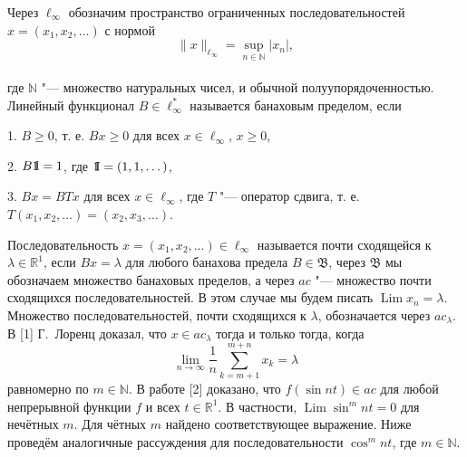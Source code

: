 
\vzmscaption



Через $\ell_\infty$ обозначим пространство ограниченных последовательностей 
$x = (x_1, x_2, \ldots)$ с нормой \\[-3mm]
$$
\|x\|_{\ell_\infty} = \sup_{n \in \mathbb N} |x_n|,
$$ \\[-3mm]
где $\mathbb N$ "--- множество натуральных чисел, и обычной полуупорядоченностью. 
Линейный функционал $B \in \ell^*_\infty$ называется банаховым пределом, если

	1. $B \geqslant 0$, т. е. $Bx \geqslant 0$ для всех $x \in \ell_\infty$,
	$x \geqslant 0$,

	2. $B\mathrm{1\negthickspace I} = 1$, где $\mathrm{1\negthickspace I} = (1, 1, \dots)$,

	3. $Bx = BTx$ для всех $x \in \ell_\infty$, где $T$ "--- оператор сдвига, т. е.
	$T(x_1, x_2, \dots) = (x_2, x_3, \dots)$.

Последовательность $x = (x_1, x_2, \ldots) \in \ell_\infty$ называется почти
сходящейся к $\lambda \in \mathbb R^1$, если $Bx = \lambda$ для любого банахова 
предела $B \in \mathfrak B$, через $\mathfrak B$ мы обозначаем множество банаховых
пределов, а через $ac$ "--- множество почти сходящихся последовательностей.
В этом случае мы будем писать $\operatorname{Lim} x_n = \lambda$. Множество
последовательностей, почти сходящихся к $\lambda$, обозначается через $ac_\lambda$.
В [1] Г.~Лоренц доказал, что $x \in ac_\lambda$ тогда и только тогда, когда \\[-3mm]
\begin{equation*}\label{Lorentz_theorem}
\lim_{n \to \infty} \frac 1n \sum_{k = m + 1}^{m + n} x_k = \lambda
\end{equation*} 
равномерно по $m \in \mathbb N$.
В работе [2] доказано, что $f(\sin nt) \in ac$ для любой непрерывной функции $f$
и всех $t \in \mathbb R^1$. В частности, $\operatorname{Lim} \sin^m nt = 0$ для
нечётных $m$. Для чётных $m$ найдено соответствующее выражение. Ниже проведём 
аналогичные рассуждения для последовательности $\cos^m nt$, где $m \in \mathbb N$.

